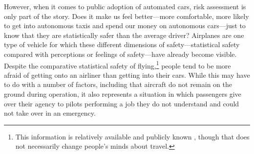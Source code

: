 

However, when it comes to public adoption of automated cars,
risk assessment is only part of the story. Does it make us feel better---more
comfortable, more likely to get into autonomous taxis and spend our
money on autonomous cars---just to know that they are statistically safer
than the average driver? Airplanes are one type of vehicle for which
these different dimensions of 
safety---statistical safety compared with perceptions or feelings of
safety---have already become visible. Despite the comparative
statistical safety of flying,\footnote{This information is relatively
  available and publicly known \cite{airlinereporter}, though that does not
  necessarily change people's minds about travel.}
people tend to be more afraid of getting onto an airliner than getting into their
cars. While this may have to do with a number of factors,
including that aircraft do not remain on the ground during operation,
it also represents a situation in which passengers give over their
agency to pilots performing a job they do not understand and could not
take over in an emergency.


